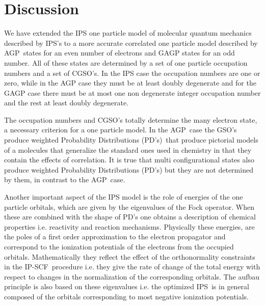 \documentclass[aps,preprint]{revtex4}%
\begin{document}
\section{Discussion\label{Discussion}}

We have extended the IPS one particle model of molecular quantum mechanics
described by IPS's to a more accurate correlated one particle model described
by AGP\ states for an even number of electrons and GAGP states for an odd
number. All of these states are determined by a set of one particle occupation
numbers and a set of CGSO's. In the IPS case the occupation numbers are one or
zero, while in the AGP case they must be at least doubly degenerate and for
the GAGP case there must be at most one non degenerate integer occupation
number and the rest at least doubly degenerate.

The occupation numbers and CGSO's totally determine the many electron state, a
necessary criterion for a one particle model. In the AGP\ case the GSO's
produce weighted Probability Distributions (PD's)\ that produce pictorial
models of a molecules that generalize the standard ones used in chemistry in
that they contain the effects of correlation. It is true that multi
configurational states also produce weighted Probability Distributions (PD's)
but they are not determined by them, in contrast to the AGP\ case.

Another important aspect of the IPS model is the role of energies of the one
particle orbitals, which are given by the eigenvalues of the Fock operator.
When these are combined with the shape of PD's one obtains a description of
chemical properties i.e. reactivity and reaction mechanisms. Physically these
energies, are the poles of a first order approximation to the electron
propagator and correspond to the ionization potentials of the electrons from
the occupied orbitals. Mathematically they reflect the effect of the
orthonormality constraints in the IP-SCF\ procedure i.e. they give the rate of
change of the total energy with respect to changes in the normalization of the
corresponding orbitals. The aufbau principle is also based on these
eigenvalues i.e. the optimized IPS\ is in general composed of the orbitals
corresponding to most negative ionization potentials.
\end{document}
